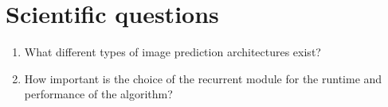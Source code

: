 \section*{Scientific questions}
 \begin{enumerate}
  \item What different types of image prediction architectures exist?
  \item How important is the choice of the recurrent module for the runtime and performance of the algorithm?
 \end{enumerate}